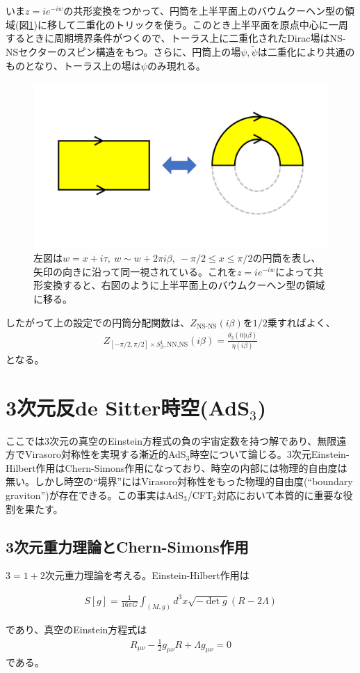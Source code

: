 いま$z=ie^{-iw}$の共形変換をつかって、円筒を上半平面上のバウムクーヘン型の領域(図\ref{fig:cyl2uhp})に移して二重化のトリックを使う。このとき上半平面を原点中心に一周するときに周期境界条件がつくので、トーラス上に二重化されたDirac場はNS-NSセクターのスピン構造をもつ。さらに、円筒上の場$\psi,\tilde{\psi}$は二重化により共通のものとなり、トーラス上の場は$\psi$のみ現れる。
\begin{figure}[h]
	\centering
	\includegraphics[width=0.7\linewidth]{cyl2uhp.pdf}
	\caption{左図は$w=x+i\tau,\  w\sim w+2\pi i\beta,\  -\pi/2\leq x \leq \pi/2$の円筒を表し、矢印の向きに沿って同一視されている。これを$z=ie^{-iw}$によって共形変換すると、右図のように上半平面上のバウムクーヘン型の領域に移る。}
	\label{fig:cyl2uhp}
\end{figure}

したがって上の設定での円筒分配関数は、$Z_\text{NS-NS}(i\beta)$を$1/2$乗すればよく、
\begin{align}
Z_{[-\pi/2,\pi/2]\times S_\beta^1,\text{NN,NS}}(i\beta)= \frac{\theta_3(0|i\beta)}{\eta(i\beta)}\label{diracPFfincyl}
\end{align}
となる。


\section{3次元反de Sitter時空(AdS$_3$)}\label{sec:ads3}
ここでは3次元の真空のEinstein方程式の負の宇宙定数を持つ解であり、無限遠方でVirasoro対称性を実現する漸近的AdS$_3$時空について論じる。3次元Einstein-Hilbert作用はChern-Simons作用になっており、時空の内部には物理的自由度は無い。しかし時空の``境界''にはVirasoro対称性をもった物理的自由度(``boundary graviton'')が存在できる。この事実はAdS$_3$/CFT$_2$対応において本質的に重要な役割を果たす。

\subsection{3次元重力理論とChern-Simons作用}
$3=1+2$次元重力理論を考える。Einstein-Hilbert作用は
\begin{oframed}
\begin{align}
S[g]=\frac{1}{16\pi G}\int_{(M,g)}d^3 x \sqrt{-\det{g}}(R-2\Lambda)
\end{align}
\end{oframed}
であり、真空のEinstein方程式は
\begin{align}
R_{\mu\nu}-\frac{1}{2}g_{\mu\nu}R+\Lambda g_{\mu\nu}=0
\end{align}
である。

